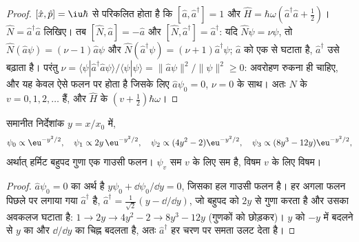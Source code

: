 \begin{proof}
$[\hat x,\hat p] = \iu\hbar$ से परिकलित होता है कि $[\hat a,\hat a^\dagger] = 1$ और
$\hat H = \hbar\omega(\hat a^\dagger\hat a + \frac12)$। $\hat N =
\hat a^\dagger\hat a$ लिखिए। तब $[\hat N,\hat a] = -\hat a$ और $[\hat N,\hat
a^\dagger] = \hat a^\dagger$: यदि $\hat N\psi = \nu\psi$, तो $\hat N(\hat
a\psi) = (\nu - 1)\hat a\psi$ और $\hat N(\hat a^\dagger\psi) = (\nu + 1)\hat
a^\dagger\psi$; $\hat a$  को एक से घटाता है, $\hat a^\dagger$ उसे
बढ़ाता है। परंतु $\nu = \langle\psi|\hat a^\dagger\hat a\psi\rangle/\langle\psi|\psi
\rangle = \|\hat a\psi\|^2/\|\psi\|^2 \ge 0$: अवरोहण रुकना ही चाहिए, और यह
केवल ऐसे फलन पर होता है जिसके लिए $\hat a\psi_0 = 0$,  $\nu = 0$ के साथ।
अतः $\hat N$ के  $v = 0, 1, 2, \dots$ हैं, और
$\hat H$ के $(v + \frac12)\hbar\omega$।
\end{proof}

\begin{proposition}\label{prop:b3:quantum-model-systems:oscillator-functions}
समानीत निर्देशांक $y = x/x_0$ में,
\[
\psi_0 \propto \eu^{-y^2/2}, \quad \psi_1 \propto 2y\,\eu^{-y^2/2}, \quad
\psi_2 \propto (4y^2 - 2)\eu^{-y^2/2}, \quad \psi_3 \propto (8y^3 -
12y)\eu^{-y^2/2},
\]
अर्थात् हर्मिट बहुपद गुणा एक गाउसी फलन। $\psi_v$ सम $v$ के लिए सम है,
विषम $v$ के लिए विषम।
\end{proposition}

\begin{proof}
$\hat a\psi_0 = 0$ का अर्थ है $y\psi_0 + \dd\psi_0/\dd y = 0$, जिसका हल
गाउसी फलन है। हर अगला फलन पिछले पर लगाया गया $\hat a^\dagger$ है,
$\hat a^\dagger = \frac{1}{\sqrt2}(y - \dd/\dd y)$, जो
बहुपद को $2y$ से गुणा करता है और उसका अवकलज घटाता है: $1 \to 2y \to 4y^2 - 2 \to
8y^3 - 12y$ (गुणकों को छोड़कर)। $y$ को $-y$ में बदलने से $y$ का
और $\dd/\dd y$ का चिह्न बदलता है, अतः $\hat a^\dagger$ हर चरण पर समता उलट देता है।
\end{proof}

